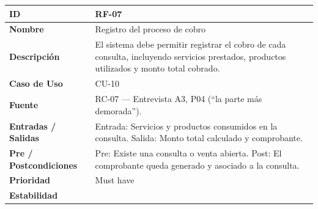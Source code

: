 \documentclass[
]{article}
\newcounter{none} %
\begin{document}
{\def\LTcaptype{none} %
\begin{longtable}[]{|
  >{\raggedright\arraybackslash}p{}|
  >{\raggedright\arraybackslash}p{}|}
\hline
\begin{minipage}[b]{\linewidth}\raggedright
\textbf{ID}
\end{minipage} & \begin{minipage}[b]{\linewidth}\raggedright
RF-07
\end{minipage} \\
\hline
\endhead
\hline
\endlastfoot
\textbf{Nombre} & \begin{minipage}[t]{\linewidth}\raggedright
Registro del proceso de cobro
\end{minipage} \\
\hline
\textbf{Descripción} & \begin{minipage}[t]{\linewidth}\raggedright
El sistema debe permitir registrar el cobro de cada consulta, incluyendo servicios prestados, productos utilizados y monto total cobrado.
\end{minipage} \\
\hline
\textbf{Caso de Uso} & \begin{minipage}[t]{\linewidth}\raggedright
CU-10
\end{minipage} \\
\hline
\textbf{Fuente} & \begin{minipage}[t]{\linewidth}\raggedright
RC-07 — Entrevista A3, P04 (“la parte más demorada”).
\end{minipage} \\
\hline
\textbf{Entradas / Salidas} & \begin{minipage}[t]{\linewidth}\raggedright
Entrada: Servicios y productos consumidos en la consulta. Salida: Monto total calculado y comprobante.
\end{minipage} \\
\hline
\textbf{Pre / Postcondiciones} & \begin{minipage}[t]{\linewidth}\raggedright
Pre: Existe una consulta o venta abierta. Post: El comprobante queda generado y asociado a la consulta.
\end{minipage} \\
\hline
\textbf{Prioridad} & \begin{minipage}[t]{\linewidth}\raggedright
Must have
\end{minipage} \\
\hline
\textbf{Estabilidad} & \begin{minipage}[t]{\linewidth}\raggedright

\end{minipage}
\end{longtable}}
\end{document}
